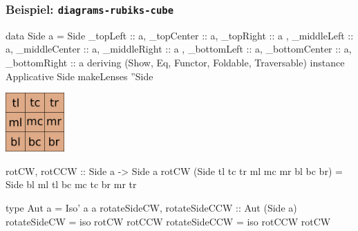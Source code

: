 \documentclass{beamer}
\begin{document}
\begin{frame}[fragile]
  \frametitle{Beispiel: \texttt{diagrams-rubiks-cube}}

  \begin{haskellcode}
data Side a = Side
  {    _topLeft :: a,    _topCenter :: a,    _topRight :: a
  , _middleLeft :: a, _middleCenter :: a, _middleRight :: a
  , _bottomLeft :: a, _bottomCenter :: a, _bottomRight :: a
  } deriving (Show, Eq, Functor, Foldable, Traversable)
instance Applicative Side
makeLenses ''Side
  \end{haskellcode}
  \vspace{0.5em}
  \begin{minipage}{0.22 \linewidth}
    \includegraphics[width=2.25cm]{side.png}
  \end{minipage}
  \begin{minipage}{0.75 \linewidth}
    \begin{haskellcode}
rotCW, rotCCW :: Side a -> Side a
rotCW (Side tl tc tr ml mc mr bl bc br) =
       Side bl ml tl bc mc tc br mr tr

type Aut a = Iso' a a
rotateSideCW, rotateSideCCW :: Aut (Side a)
rotateSideCW  = iso rotCW  rotCCW
rotateSideCCW = iso rotCCW rotCW
    \end{haskellcode}
  \end{minipage}
\end{frame}
\end{document}
